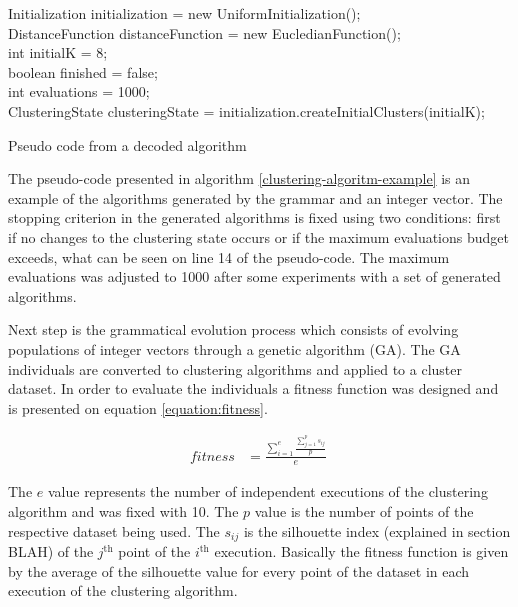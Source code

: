 \documentclass[journal]{IEEEtran}
\begin{document}
\begin{algorithm}[!htb]
	\label{clustering-algoritm-example}
	Initialization initialization = new UniformInitialization(); \\
	DistanceFunction distanceFunction = new EucledianFunction(); \\
	int initialK = 8; \\
	boolean finished = false; \\
	int evaluations = 1000;\\
	ClusteringState 
	clusteringState = initialization.createInitialClusters(initialK); \\
	\caption{Pseudo code from a decoded algorithm}
\end{algorithm}

The pseudo-code presented in algorithm \ref{clustering-algoritm-example} is an example of the algorithms generated by the grammar and an integer vector. The stopping criterion in the generated algorithms is fixed using two conditions: first if no changes to the clustering state occurs or if the maximum evaluations budget exceeds, what can be seen on line 14 of the pseudo-code. The maximum evaluations was adjusted to 1000 after some experiments with a set of generated algorithms.

Next step is the grammatical evolution process which consists of evolving populations of integer vectors through a genetic algorithm (GA). The GA individuals are converted to clustering algorithms and applied to a cluster dataset. In order to evaluate the individuals a fitness function  was designed and is presented on equation \ref{equation:fitness}.

\begin{align}
	\label{equation:fitness}
	fitness    &= \frac{\sum_{i=1}^e \frac{\sum_{j=1}^{p} s_{ij}}{p}}{e}
	\
\end{align}

The $e$ value represents the number of independent executions of the clustering algorithm and was fixed with 10. The $p$ value is the number of points of the respective dataset being used. The $s_{ij}$ is the silhouette index (explained in section BLAH) of the $j^{\text{th}}$ point of the $i^{\text{th}}$ execution. Basically the fitness function is given by the average of the silhouette value for every point of the dataset in each execution of the clustering algorithm.
\end{document}
